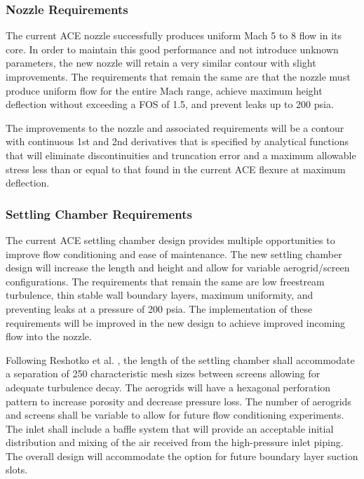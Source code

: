 \subsubsection*{Nozzle Requirements}

The current ACE nozzle successfully produces uniform Mach 5 to 8 flow in its core. In order to maintain this good performance and not introduce unknown parameters, the new nozzle will retain a very similar contour with slight improvements. The requirements that remain the same are that the nozzle must produce uniform flow for the entire Mach range, achieve maximum height deflection without exceeding a FOS of 1.5, and prevent leaks up to 200 psia.

The improvements to the nozzle and associated requirements will be a contour with continuous 1st and 2nd derivatives that is specified by analytical functions that will eliminate discontinuities and truncation error and a maximum allowable stress less than or equal to that found in the current ACE flexure at maximum deflection.

\subsubsection*{Settling Chamber Requirements}

The current ACE settling chamber design provides multiple opportunities to improve flow conditioning and ease of maintenance. The new settling chamber design will increase the length and height and allow for variable aerogrid/screen configurations. The requirements that remain the same are low freestream turbulence, thin stable wall boundary layers, maximum uniformity, and preventing leaks at a pressure of 200 psia. The implementation of these requirements will be improved in the new design to achieve improved incoming flow into the nozzle.

Following Reshotko et al. \cite{reshotko}, the length of the settling chamber shall accommodate a separation of 250 characteristic mesh sizes between screens allowing for adequate turbulence decay. The aerogrids will have a hexagonal perforation pattern to increase porosity and decrease pressure loss. The number of aerogrids and screens shall be variable to allow for future flow conditioning experiments. The inlet shall include a baffle system that will provide an acceptable initial distribution and mixing of the air received from the high-pressure inlet piping. The overall design will accommodate the option for future boundary layer suction slots.

